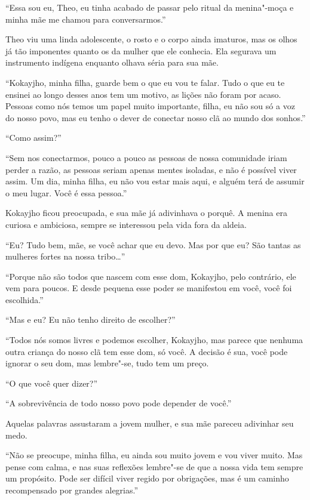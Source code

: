 ``Essa sou eu, Theo, eu tinha acabado de passar pelo ritual da
menina"-moça e minha mãe me chamou para conversarmos.''

Theo viu uma linda adolescente, o rosto e o corpo ainda imaturos, mas os
olhos já tão imponentes quanto os da mulher que ele conhecia. Ela
segurava um instrumento indígena enquanto olhava séria para sua mãe.

``Kokayjho, minha filha, guarde bem o que eu vou te falar. Tudo o que eu
te ensinei ao longo desses anos tem um motivo, as lições não foram por
acaso. Pessoas como nós temos um papel muito importante, filha, eu não
sou só a voz do nosso povo, mas eu tenho o dever de conectar nosso clã
ao mundo dos sonhos.''

``Como assim?''

``Sem nos conectarmos, pouco a pouco as pessoas de nossa comunidade
iriam perder a razão, as pessoas seriam apenas mentes isoladas, e não é
possível viver assim. Um dia, minha filha, eu não vou estar mais aqui, e
alguém terá de assumir o meu lugar. Você é essa pessoa.''

Kokayjho ficou preocupada, e sua mãe já adivinhava o porquê. A menina era
curiosa e ambiciosa, sempre se interessou pela vida fora da aldeia.

``Eu? Tudo bem, mãe, se você achar que eu devo. Mas por que eu? São
tantas as mulheres fortes na nossa tribo\ldots{}''

``Porque não são todos que nascem com esse dom, Kokayjho, pelo
contrário, ele vem para poucos. E desde pequena esse poder se manifestou
em você, você foi escolhida.''

``Mas e eu? Eu não tenho direito de escolher?''

``Todos nós somos livres e podemos escolher, Kokayjho, mas parece que
nenhuma outra criança do nosso clã tem esse dom, só você. A decisão é
sua, você pode ignorar o seu dom, mas lembre"-se, tudo tem um preço.

``O que você quer dizer?''

``A sobrevivência de todo nosso povo pode depender de você.''

Aquelas palavras assustaram a jovem mulher, e sua mãe pareceu adivinhar
seu medo.

``Não se preocupe, minha filha, eu ainda sou muito jovem e vou viver
muito. Mas pense com calma, e nas suas reflexões lembre"-se de que a nossa
vida tem sempre um propósito. Pode ser difícil viver regido por
obrigações, mas é um caminho recompensado por grandes alegrias.''

